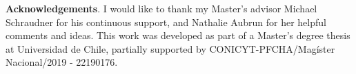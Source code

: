 \documentclass[letterpaper,11pt,reqno]{amsart}
\theoremstyle{plain}
\theoremstyle{definition}
\begin{document}
	
	\textbf{Acknowledgements}. I would like to thank my Master's advisor Michael Schraudner for his continuous support, and Nathalie Aubrun for her helpful comments and ideas. This work was developed as part of a Master's degree thesis at Universidad de Chile, partially supported by CONICYT-PFCHA/Mag\'ister Nacional/2019 - 22190176. 
	

{}
\end{document}
